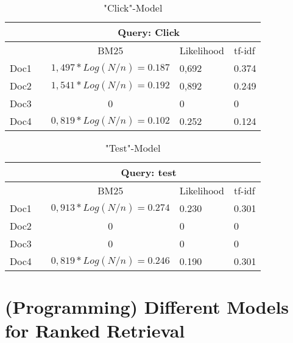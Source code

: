 \documentclass{scrartcl}
\begin{document}
\begin{table}[h]
\centering
\caption{"Click"-Model}
\label{click-model}
\begin{tabular}{|l|c|c|l|l|l|l|}
\hline
     & \multicolumn{6}{c|}{Query: Click}                                                           \\ \hline
     &  & BM25                     & \multicolumn{2}{l|}{Likelihood} & \multicolumn{2}{l|}{tf-idf} \\ \hline
Doc1 &  & $1,497* Log(N/n) = 0.187$  & \multicolumn{2}{l|}{0,692}      & \multicolumn{2}{l|}{0.374}  \\ \hline
Doc2 &  & $1,541* Log(N/n) = 0.192$  & \multicolumn{2}{l|}{0,892}      & \multicolumn{2}{l|}{0.249}  \\ \hline
Doc3 &  & 0                        & \multicolumn{2}{l|}{0}          & \multicolumn{2}{l|}{0}      \\ \hline
Doc4 &  & $0,819 *Log(N/n) = 0.102$ & \multicolumn{2}{l|}{0.252}      & \multicolumn{2}{l|}{0.124}  \\ \hline
\end{tabular}
\end{table}

\begin{table}[h]
\centering
\caption{"Test"-Model}
\label{test-model}
\begin{tabular}{|l|c|c|l|l|l|l|}
\hline
     & \multicolumn{6}{c|}{Query: test}                                                            \\ \hline
     &  & BM25                     & \multicolumn{2}{l|}{Likelihood} & \multicolumn{2}{l|}{tf-idf} \\ \hline
Doc1 &  & $0,913* Log(N/n) = 0.274$  & \multicolumn{2}{l|}{0.230}      & \multicolumn{2}{l|}{0.301}  \\ \hline
Doc2 &  & 0                        & \multicolumn{2}{l|}{0}          & \multicolumn{2}{l|}{0}      \\ \hline
Doc3 &  & 0                        & \multicolumn{2}{l|}{0}          & \multicolumn{2}{l|}{0}      \\ \hline
Doc4 &  & $0,819 * Log(N/n) = 0.246$ & \multicolumn{2}{l|}{0.190}      & \multicolumn{2}{l|}{0.301}  \\ \hline
\end{tabular}
\end{table}


\section{(Programming)  Different Models for Ranked Retrieval
}
\end{document}
